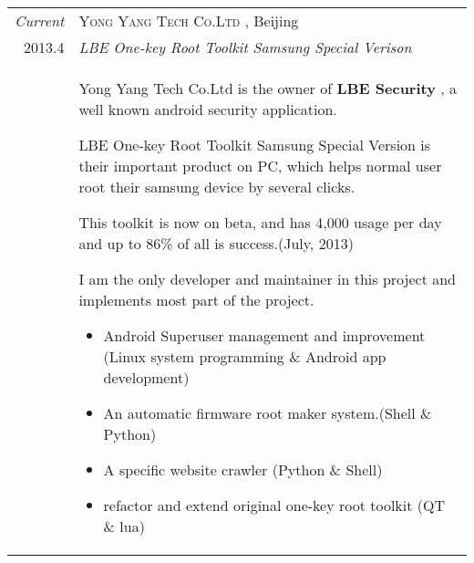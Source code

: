 \documentclass[a4paper,10pt]{article} %
\begin{document}
\begin{tabular}{r|p{11cm}}


\emph{Current} &  \textsc{ Yong Yang Tech Co.Ltd }, Beijing \smallskip\\
\textsc{2013.4} & \emph{LBE One-key Root Toolkit Samsung Special Verison}\\ 
& \footnotesize{
Yong Yang Tech Co.Ltd is the owner of \textbf{LBE Security} , a well known android security application.

LBE One-key Root Toolkit Samsung Special Version is their important product on PC, which helps normal user root their samsung device by several clicks.

This toolkit is now on beta, and has 4,000 usage per day and up to 86\% of all is success.(July, 2013)

I am the only developer and maintainer in this project and implements most part of the project.

\begin{itemize}
\item Android Superuser management and improvement (Linux system programming \& Android app development)
\item An automatic firmware root maker system.(Shell \& Python)
\item A specific website crawler (Python \& Shell)
\item refactor and extend original one-key root toolkit (QT \& lua)
\end{itemize}

}\smallskip\\



\end{tabular}
\end{document}
